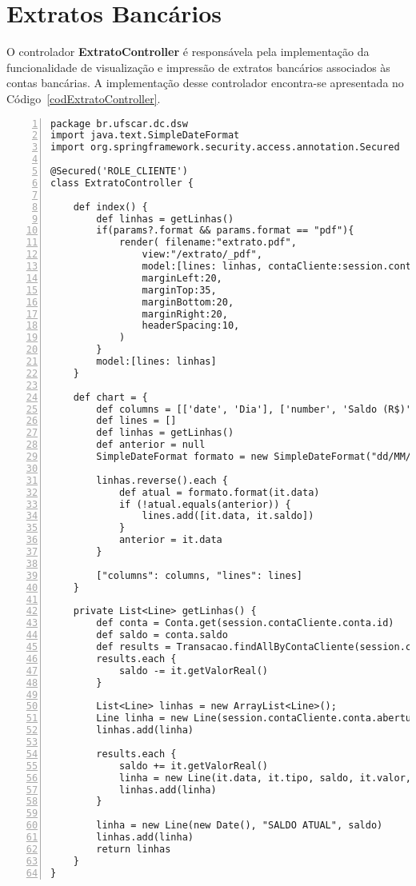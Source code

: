 \newpage

\section{Extratos Bancários}

\vspace{0.5cm}

O  controlador  {\bf ExtratoController}  é  responsávela  pela implementação  da
funcionalidade de  visualização e impressão de extratos  bancários associados às
contas bancárias.  A implementação desse controlador  encontra-se apresentada no
Código~\ref{codExtratoController}. 

\begin{lstlisting}[caption=  Controlador  {\bf  ExtratoController},  frame=trBL,
    float=htbp, label=codExtratoController, numbers=left] 
package br.ufscar.dc.dsw
import java.text.SimpleDateFormat
import org.springframework.security.access.annotation.Secured

@Secured('ROLE_CLIENTE')
class ExtratoController { 

    def index() {
        def linhas = getLinhas()
        if(params?.format && params.format == "pdf"){
            render( filename:"extrato.pdf",
                view:"/extrato/_pdf",
                model:[lines: linhas, contaCliente:session.contaCliente],
                marginLeft:20,
                marginTop:35,
                marginBottom:20,
                marginRight:20,
                headerSpacing:10,
            )   
        }
        model:[lines: linhas]
    }
    
    def chart = {
        def columns = [['date', 'Dia'], ['number', 'Saldo (R$)']]
        def lines = []
        def linhas = getLinhas()
        def anterior = null
        SimpleDateFormat formato = new SimpleDateFormat("dd/MM/yyyy")

        linhas.reverse().each {
            def atual = formato.format(it.data)
            if (!atual.equals(anterior)) {
                lines.add([it.data, it.saldo])                
            }
            anterior = it.data
        }
          
        ["columns": columns, "lines": lines]
    }

    private List<Line> getLinhas() {
        def conta = Conta.get(session.contaCliente.conta.id)
        def saldo = conta.saldo
        def results = Transacao.findAllByContaCliente(session.contaCliente, [sort:"data"])
        results.each {
            saldo -= it.getValorReal()
        }

        List<Line> linhas = new ArrayList<Line>();
        Line linha = new Line(session.contaCliente.conta.abertura, "ABERTURA", saldo)
        linhas.add(linha)       

        results.each {
            saldo += it.getValorReal()
            linha = new Line(it.data, it.tipo, saldo, it.valor, it.motivo)
            linhas.add(linha)
        }

        linha = new Line(new Date(), "SALDO ATUAL", saldo)
        linhas.add(linha)
        return linhas
    }
}
\end{lstlisting} 

